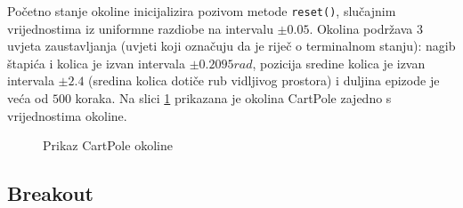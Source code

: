 Početno stanje okoline inicijalizira pozivom metode \texttt{reset()}, slučajnim vrijednostima iz uniformne razdiobe na intervalu $\pm 0.05$. Okolina podržava 3 uvjeta zaustavljanja (uvjeti koji označuju da je riječ o terminalnom stanju): nagib štapića i kolica je izvan intervala $\pm 0.2095 rad$, pozicija sredine kolica je izvan intervala $\pm 2.4$ (sredina kolica dotiče rub vidljivog prostora) i duljina epizode je veća od $500$ koraka. Na slici \ref{fig:cart-pole} prikazana je okolina CartPole zajedno s vrijednostima okoline. %

\begin{figure}[H]
    \centering
    \caption{Prikaz CartPole okoline}
    \label{fig:cart-pole}
\end{figure}

\subsection{Breakout}


